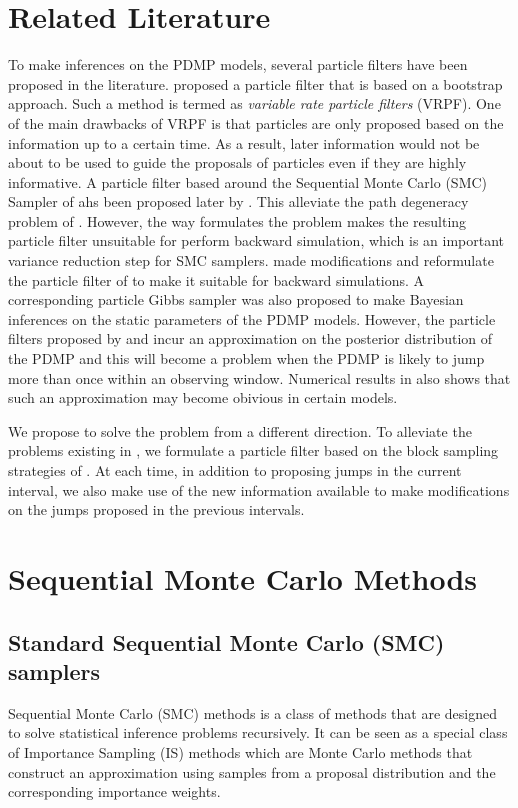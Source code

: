 \documentclass[12pt,a4paper]{article}
\begin{document}
\section{Related Literature}
To make inferences on the PDMP models, several particle filters have been proposed in the literature. \cite{godsill2005variable} proposed a particle filter that is based on a bootstrap approach. Such a method is termed as \textit{variable rate particle filters} (VRPF). One of the main drawbacks of VRPF is that particles are only proposed based on the information up to a certain time. As a result, later information would not be about to be used to guide the proposals of particles even if they are highly informative.  A particle filter based around the Sequential Monte Carlo (SMC) Sampler of \cite{del2006sequential} ahs been proposed later by \cite{whiteley2011monte}. This alleviate the path degeneracy problem of \cite{godsill2005variable}. However, the way \cite{whiteley2011monte} formulates the problem makes the resulting particle filter unsuitable for perform backward simulation, which is an important variance reduction step for SMC samplers. \cite{finke2014static} made modifications and reformulate the particle filter of \cite{whiteley2011monte} to make it suitable for backward simulations. A corresponding particle Gibbs sampler was also proposed to make Bayesian inferences on the static parameters of the PDMP models. However, the particle filters proposed by \cite{whiteley2011monte} and \cite{finke2014static} incur an approximation on the posterior distribution of the PDMP and this will become a problem when the PDMP is likely to jump more than once within an observing window. Numerical results in \cite{finke2014static} also shows that such an approximation may become obivious in certain models. 

We propose to solve the problem from a different direction. To alleviate the problems existing in \cite{godsill2005variable}, we formulate a particle filter based on the block sampling strategies of \cite{doucet2006efficient}. At each time, in addition to proposing jumps in the current interval, we also make use of the new information available to make modifications on the jumps proposed in the previous intervals. 




\section{Sequential Monte Carlo Methods}
\subsection{Standard Sequential Monte Carlo (SMC) samplers}
Sequential Monte Carlo (SMC) methods is a class of methods that are designed to solve statistical inference problems recursively. It can be seen as a special class of Importance Sampling (IS) methods which are Monte Carlo methods that construct an approximation using samples from a proposal distribution and the corresponding importance weights. 
\end{document}
